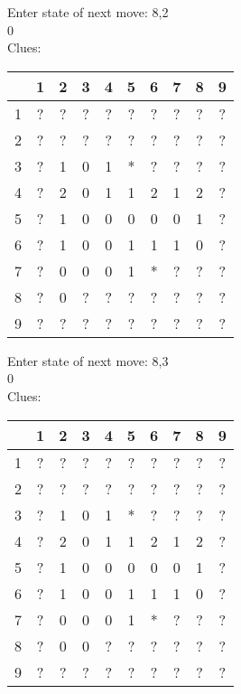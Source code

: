 Enter state of next move: 8,2\\
0\\
Clues:\\
\begin{tabular}{|c|c|c|c|c|c|c|c|c|c|}
\hline
  & 1 & 2 & 3 & 4 & 5 & 6 & 7 & 8 & 9\\
\hline
1 & ? & ? & ? & ? & ? & ? & ? & ? & ?\\
\hline
2 & ? & ? & ? & ? & ? & ? & ? & ? & ?\\
\hline
3 & ? & 1 & 0 & 1 & * & ? & ? & ? & ?\\
\hline
4 & ? & 2 & 0 & 1 & 1 & 2 & 1 & 2 & ?\\
\hline
5 & ? & 1 & 0 & 0 & 0 & 0 & 0 & 1 & ?\\
\hline
6 & ? & 1 & 0 & 0 & 1 & 1 & 1 & 0 & ?\\
\hline
7 & ? & 0 & 0 & 0 & 1 & * & ? & ? & ?\\
\hline
8 & ? & 0 & ? & ? & ? & ? & ? & ? & ?\\
\hline
9 & ? & ? & ? & ? & ? & ? & ? & ? & ?\\
\hline
\end{tabular}

Enter state of next move: 8,3\\
0\\
Clues:\\
\begin{tabular}{|c|c|c|c|c|c|c|c|c|c|}
\hline
  & 1 & 2 & 3 & 4 & 5 & 6 & 7 & 8 & 9\\
\hline
1 & ? & ? & ? & ? & ? & ? & ? & ? & ?\\
\hline
2 & ? & ? & ? & ? & ? & ? & ? & ? & ?\\
\hline
3 & ? & 1 & 0 & 1 & * & ? & ? & ? & ?\\
\hline
4 & ? & 2 & 0 & 1 & 1 & 2 & 1 & 2 & ?\\
\hline
5 & ? & 1 & 0 & 0 & 0 & 0 & 0 & 1 & ?\\
\hline
6 & ? & 1 & 0 & 0 & 1 & 1 & 1 & 0 & ?\\
\hline
7 & ? & 0 & 0 & 0 & 1 & * & ? & ? & ?\\
\hline
8 & ? & 0 & 0 & ? & ? & ? & ? & ? & ?\\
\hline
9 & ? & ? & ? & ? & ? & ? & ? & ? & ?\\
\hline
\end{tabular}

